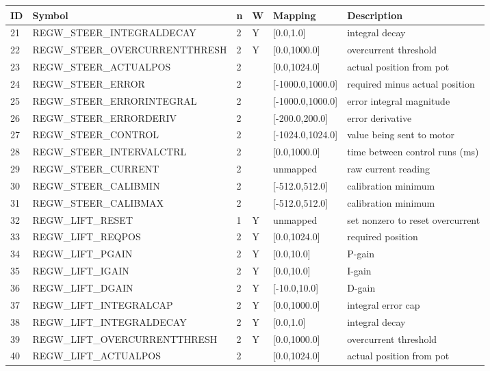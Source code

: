 \begin{tabular}{|p{0.2in}|p{2.7in}|p{0.1in}|p{0.1in}|p{1in}|p{1.5in}|}\hline
\textbf{ID} & \textbf{Symbol} & \textbf{n} & \textbf{W} & \textbf{Mapping} & \textbf{Description}  \\ \hline 
21 & REGW\_STEER\_INTEGRALDECAY & 2 & Y & [0.0,1.0] & integral decay\\ \hline
22 & REGW\_STEER\_OVERCURRENTTHRESH & 2 & Y & [0.0,1000.0] & overcurrent threshold\\ \hline
23 & REGW\_STEER\_ACTUALPOS & 2 &  & [0.0,1024.0] & actual position from pot\\ \hline
24 & REGW\_STEER\_ERROR & 2 &  & [-1000.0,1000.0] & required minus actual position\\ \hline
25 & REGW\_STEER\_ERRORINTEGRAL & 2 &  & [-1000.0,1000.0] & error integral magnitude\\ \hline
26 & REGW\_STEER\_ERRORDERIV & 2 &  & [-200.0,200.0] & error derivative\\ \hline
27 & REGW\_STEER\_CONTROL & 2 &  & [-1024.0,1024.0] & value being sent to motor\\ \hline
28 & REGW\_STEER\_INTERVALCTRL & 2 &  & [0.0,1000.0] & time between control runs (ms)\\ \hline
29 & REGW\_STEER\_CURRENT & 2 &  & unmapped & raw current reading\\ \hline
30 & REGW\_STEER\_CALIBMIN & 2 &  & [-512.0,512.0] & calibration minimum\\ \hline
31 & REGW\_STEER\_CALIBMAX & 2 &  & [-512.0,512.0] & calibration minimum\\ \hline
32 & REGW\_LIFT\_RESET & 1 & Y & unmapped & set nonzero to reset overcurrent\\ \hline
33 & REGW\_LIFT\_REQPOS & 2 & Y & [0.0,1024.0] & required position\\ \hline
34 & REGW\_LIFT\_PGAIN & 2 & Y & [0.0,10.0] & P-gain\\ \hline
35 & REGW\_LIFT\_IGAIN & 2 & Y & [0.0,10.0] & I-gain\\ \hline
36 & REGW\_LIFT\_DGAIN & 2 & Y & [-10.0,10.0] & D-gain\\ \hline
37 & REGW\_LIFT\_INTEGRALCAP & 2 & Y & [0.0,1000.0] & integral error cap\\ \hline
38 & REGW\_LIFT\_INTEGRALDECAY & 2 & Y & [0.0,1.0] & integral decay\\ \hline
39 & REGW\_LIFT\_OVERCURRENTTHRESH & 2 & Y & [0.0,1000.0] & overcurrent threshold\\ \hline
40 & REGW\_LIFT\_ACTUALPOS & 2 &  & [0.0,1024.0] & actual position from pot\\ \hline

\end{tabular}
